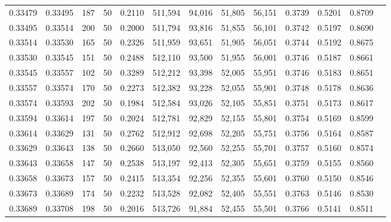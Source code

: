 \begin{tabular}{rrrrrrrrrrrrr}
0.33479 & 0.33495 &   187 &  50 &                                     0.2110 & 511,594 &  94,016 &  51,805 &  56,151 & 0.3739 & 0.5201 & 0.8709 \\
0.33495 & 0.33514 &   200 &  50 &                                     0.2000 & 511,794 &  93,816 &  51,855 &  56,101 & 0.3742 & 0.5197 & 0.8690 \\
0.33514 & 0.33530 &   165 &  50 &                                     0.2326 & 511,959 &  93,651 &  51,905 &  56,051 & 0.3744 & 0.5192 & 0.8675 \\
0.33530 & 0.33545 &   151 &  50 &                                     0.2488 & 512,110 &  93,500 &  51,955 &  56,001 & 0.3746 & 0.5187 & 0.8661 \\
0.33545 & 0.33557 &   102 &  50 &                                     0.3289 & 512,212 &  93,398 &  52,005 &  55,951 & 0.3746 & 0.5183 & 0.8651 \\
0.33557 & 0.33574 &   170 &  50 &                                     0.2273 & 512,382 &  93,228 &  52,055 &  55,901 & 0.3748 & 0.5178 & 0.8636 \\
0.33574 & 0.33593 &   202 &  50 &                                     0.1984 & 512,584 &  93,026 &  52,105 &  55,851 & 0.3751 & 0.5173 & 0.8617 \\
0.33594 & 0.33614 &   197 &  50 &                                     0.2024 & 512,781 &  92,829 &  52,155 &  55,801 & 0.3754 & 0.5169 & 0.8599 \\
0.33614 & 0.33629 &   131 &  50 &                                     0.2762 & 512,912 &  92,698 &  52,205 &  55,751 & 0.3756 & 0.5164 & 0.8587 \\
0.33629 & 0.33643 &   138 &  50 &                                     0.2660 & 513,050 &  92,560 &  52,255 &  55,701 & 0.3757 & 0.5160 & 0.8574 \\
0.33643 & 0.33658 &   147 &  50 &                                     0.2538 & 513,197 &  92,413 &  52,305 &  55,651 & 0.3759 & 0.5155 & 0.8560 \\
0.33658 & 0.33673 &   157 &  50 &                                     0.2415 & 513,354 &  92,256 &  52,355 &  55,601 & 0.3760 & 0.5150 & 0.8546 \\
0.33673 & 0.33689 &   174 &  50 &                                     0.2232 & 513,528 &  92,082 &  52,405 &  55,551 & 0.3763 & 0.5146 & 0.8530 \\
0.33689 & 0.33708 &   198 &  50 &                                     0.2016 & 513,726 &  91,884 &  52,455 &  55,501 & 0.3766 & 0.5141 & 0.8511 \\

\end{tabular}
